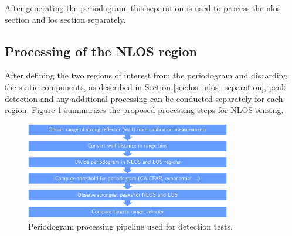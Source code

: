 			
			After generating the periodogram, this separation is used to process the \gls{nlos} section and \gls{los} section separately.
		
		\subsection{Processing of the NLOS region}
		
			After defining the two regions of interest from the periodogram and discarding the static components, as described in Section \ref{sec:los_nlos_separation}, peak detection and any additional processing can be conducted separately for each region. 
			Figure \ref{fig:Test1_NLOS-proc-pipeline} summarizes the proposed processing steps for NLOS sensing.
			
			
			\begin{figure}[H]
				\centering
				\includegraphics[width=0.8\textwidth]{Images/Test1/NLOS-proc-pipeline_wide_text12.png}
				\caption{\small Periodogram processing pipeline used for detection tests.}
				\label{fig:Test1_NLOS-proc-pipeline}
			\end{figure}
			
			
		 
			
			
		







